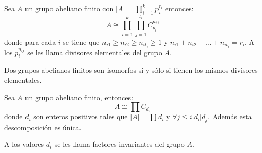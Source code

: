 \begin{nth}
Sea $A$ un grupo abeliano finito con $|A| = \prod_{i = 1}^k p_i^{r_i}$ entonces: $$A \cong \prod_{i = 1}^k \prod_{j = 1}^{t_i} C_{p_i}^{n_{ij}}$$ donde para cada $i$ se tiene que $n_{i1} \ge n_{i2} \ge n_{it_i} \ge 1$ y $n_{i1} + n_{i2} + \ldots + n_{it_i} = r_i$. A los $p_i^{n_{ij}}$ se les llama divisores elementales del grupo $A$. 
\end{nth}

\begin{ncor}
Dos grupos abelianos finitos son isomorfos si y sólo si tienen los mismos divisores elementales. 
\end{ncor}

\begin{ejemplo}

\end{ejemplo}

\begin{nth}
Sea $A$ un grupo abeliano finito, entonces: $$A \cong \prod C_{d_i}$$ donde $d_i$ son enteros positivos tales que $|A| = \prod d_i$ y $\forall j \le i. d_i | d_j$. Además esta descomposición es única. 

A los valores $d_i$ se les llama factores invariantes del grupo $A$.  
\end{nth}
